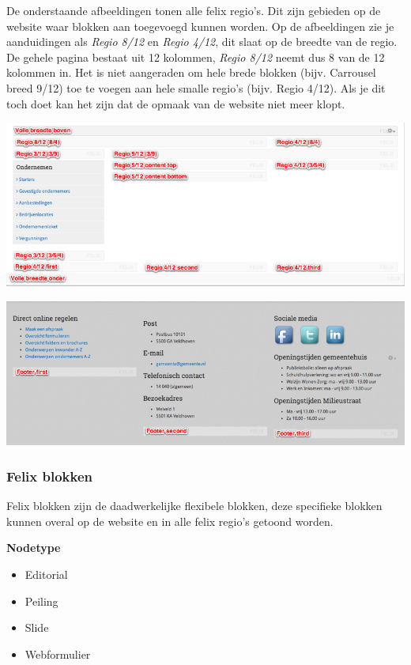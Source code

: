 De onderstaande afbeeldingen tonen alle felix regio's. Dit zijn gebieden op de website waar blokken aan toegevoegd kunnen worden. Op de afbeeldingen zie je aanduidingen als \emph{Regio 8/12} en \emph{Regio 4/12}, dit slaat op de breedte van de regio. De gehele pagina bestaat uit 12 kolommen, \emph{Regio 8/12} neemt dus 8 van de 12 kolommen in. Het is niet aangeraden om hele brede blokken (bijv. Carrousel breed 9/12) toe te voegen aan hele smalle regio's (bijv. Regio 4/12). Als je dit toch doet kan het zijn dat de opmaak van de website niet meer klopt.

\begin{center}
	\includegraphics[width=\textwidth]{img/felix1.png}
\end{center}

\begin{center}
	\includegraphics[width=\textwidth]{img/felix2.png}
\end{center}

\subsubsection{Felix blokken}\label{felixblokken}

Felix blokken zijn de daadwerkelijke flexibele blokken, deze specifieke blokken kunnen overal op de website en in alle felix regio's getoond worden.

\textbf{Nodetype}

\begin{itemize}
\item Editorial
\item Peiling
\item Slide 
\item Webformulier
\end{itemize}

